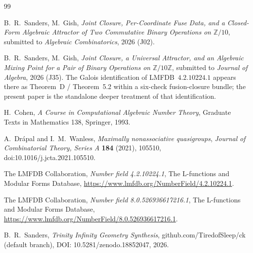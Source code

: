 \documentclass[11pt,reqno]{amsart}
\theoremstyle{plain}
\theoremstyle{definition}
\theoremstyle{remark}
\newcommand{\Z}{\mathbb{Z}}
\begin{document}
\begin{thebibliography}{99}

 B.~R.~Sanders, M.~Gish,
\emph{Joint Closure, Per-Coordinate Fuse Data, and a Closed-Form
Algebraic Attractor of Two Commutative Binary Operations on
$\Z/10$}, submitted to \emph{Algebraic Combinatorics}, 2026 (J02).

 B.~R.~Sanders, M.~Gish,
\emph{Joint Closure, a Universal Attractor, and an Algebraic Mixing
Point for a Pair of Binary Operations on $\Z/10\Z$}, submitted to
\emph{Journal of Algebra}, 2026 (J35). The Galois identification of
LMFDB~$4.2.10224.1$ appears there as Theorem~D / Theorem~5.2 within a
six-check fusion-closure bundle; the present paper is the standalone
deeper treatment of that identification.

 H.~Cohen,
\emph{A Course in Computational Algebraic Number Theory},
Graduate Texts in Mathematics 138, Springer, 1993.

 A.~Dr\'apal and I.~M.~Wanless,
\emph{Maximally nonassociative quasigroups},
\textit{Journal of Combinatorial Theory, Series A} \textbf{184} (2021),
105510, doi:10.1016/j.jcta.2021.105510.

 The {LMFDB} Collaboration,
\emph{Number field 4.2.10224.1},
The L-functions and Modular Forms Database,
\url{https://www.lmfdb.org/NumberField/4.2.10224.1}.

 The {LMFDB} Collaboration,
\emph{Number field 8.0.526936617216.1},
The L-functions and Modular Forms Database,
\url{https://www.lmfdb.org/NumberField/8.0.526936617216.1}.

 B.~R.~Sanders,
\emph{Trinity Infinity Geometry Synthesis},
github.com/TiredofSleep/ck (default branch),
DOI: 10.5281/zenodo.18852047, 2026.

\end{thebibliography}
\end{document}
